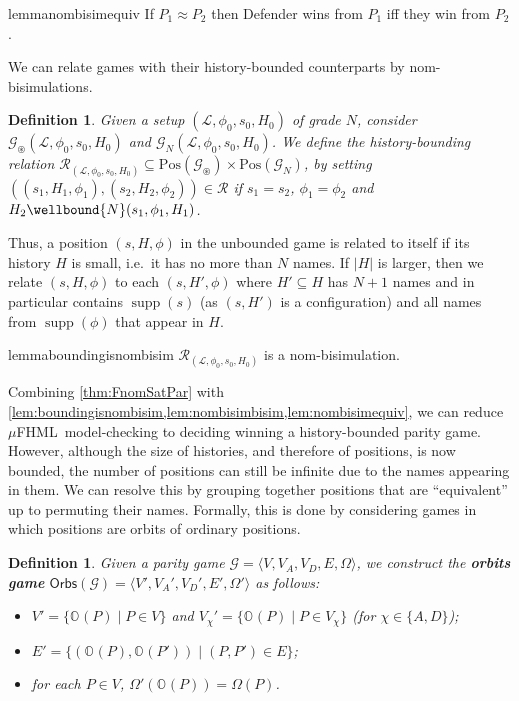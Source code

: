 \documentclass[10pt,a4paper]{article}
\newtheorem{definition}[theorem]{Definition}
\theoremstyle{definition}
\theoremstyle{remark}
\newcommand\boldemph[1]{\emph{\textbf{#1}}}
\newcommand\bisim{\approx}
\newcommand\fhml[0]{$\mu$FHML}
\newcommand\pos[0]{\mathrm{Pos}}
\DeclareMathOperator{\supp}{supp}
\newcommand\Gcal{\mathcal{G}}
\newcommand\Lcal{\mathcal{L}}
\newcommand\Rcal{\mathcal{R}}
\newcommand\orbs[1][]{\mathbb{O}_{#1}}
\renewcommand\S{N}
\newcommand\fgame[0]{\Gcal_\circledast}
\newcommand\gorb[0]{{\mathsf{Orbs}}}
\begin{document}
\begin{restatable}{lemma}{nombisimequiv}\label{lem:nombisimequiv}
If $P_1\bisim P_2$ then Defender wins from $P_1$ iff they win from $P_2$.
\end{restatable}


We can relate games with their history-bounded counterparts by nom-bisimulations.


\begin{definition}\label{def:theFreshRelation}
Given a setup $(\Lcal,\phi_0,s_0,H_0)$ of grade $N$, consider $\fgame(\Lcal, \phi_0,s_0, H_0)$  and $\Gcal_\S(\Lcal, \phi_0, s_0, H_0)$.
We define the \emph{history-bounding relation} $\Rcal_{(\Lcal, \phi_0, s_0, H_0)} \subseteq \pos(\fgame) \times \pos(\Gcal_\S)$, by setting $((s_1, H_1, \phi_1), (s_2, H_2, \phi_2)) \in \Rcal$ if $s_1 = s_2$, $\phi_1 = \phi_2$ and $H_2\wellbound{N}(s_1,\phi_1,H_1)$.
                \end{definition}

Thus, a position $(s,H,\phi)$ in the unbounded game is related to itself if its history $H$ is small, i.e.\ it has no more than $N$ names. If $|H|$ is larger, then we relate $(s,H,\phi)$ to each $(s,H',\phi)$ where $H'\subseteq H$ has $N+1$ names and in particular contains $\supp(s)$ (as $(s,H')$ is a configuration) and all names from $\supp(\phi)$ that appear in $H$. 



\begin{restatable}{lemma}{boundingisnombisim}\label{lem:boundingisnombisim}
                                $\Rcal_{(\Lcal, \phi_0, s_0, H_0)}$ is a nom-bisimulation.
\end{restatable}

Combining \cref{thm:FnomSatPar} with \cref{lem:boundingisnombisim,lem:nombisimbisim,lem:nombisimequiv}, we can reduce \fhml\ model-checking to deciding winning a history-bounded parity game. However,
although the size of histories, and therefore of positions, is now bounded, the number of positions can still be infinite due to the names appearing in them. We can resolve this by grouping together positions that are ``equivalent'' up to permuting their names. Formally, this is done by considering games in which positions are orbits of ordinary positions.


\begin{definition} 
    Given a parity game $\Gcal=\langle V,V_A,V_D,E,\Omega\rangle$, 
    we construct the \boldemph{orbits game} $\gorb(\Gcal)=\langle V',V_A',V_D',E',\Omega'\rangle$ as follows:
    \begin{itemize}
    \item $V' = \{\orbs(P) \mid P \in V\}$ and $V_\chi'=\{\orbs(P) \mid P \in V_\chi\}$ (for $\chi\in\{A,D\}$);
      \item $E'=\{(\orbs(P),\orbs(P'))\mid (P,P')\in E\}$;
        \item  for each $P\in V$, $\Omega'(\orbs(P)) = \Omega(P)$. 
    \end{itemize}
\end{definition}
\end{document}
